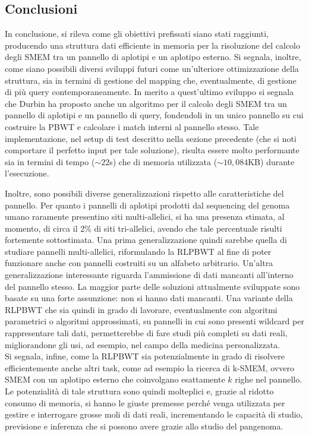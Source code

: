 \documentclass[a4paper,11pt, oneside,italian]{article}
\begin{document}
\subsection*{Conclusioni}
In conclusione, si rileva come gli obiettivi prefissati siano stati raggiunti,
producendo una struttura dati efficiente in memoria per la risoluzione del
calcolo degli SMEM tra un pannello di aplotipi e un aplotipo
esterno.  
Si segnala, inoltre, come siano possibili diversi sviluppi futuri come
un'ulteriore ottimizzazione della struttura, sia in termini 
di gestione del mapping che, eventualmente, di gestione di più query
contemporaneamente. In merito a quest'ultimo sviluppo si segnala che Durbin
ha proposto anche un algoritmo per il calcolo degli SMEM tra un pannello di
aplotipi e un pannello di query, fondendoli in un unico pannello su cui
costruire la PBWT e calcolare i match interni al pannello stesso. Tale
implementazione, nel setup di test 
descritto nella sezione precedente (che si noti comportare il perfetto input per
tale soluzione), risulta essere molto performante sia in
termini di tempo ($\sim 22$s) che di memoria utilizzata ($\sim
10,084$KB) durante l'esecuzione. 

Inoltre, sono possibili diverse generalizzazioni rispetto alle caratteristiche
del pannello. Per quanto i pannelli di aplotipi prodotti dal sequencing del
genoma umano raramente presentino siti multi-allelici, si ha una 
presenza stimata, al momento, di circa il 2\% di siti tri-allelici, avendo che
tale percentuale risulti fortemente sottostimata. Una prima generalizzazione
quindi sarebbe quella di studiare pannelli multi-allelici, riformulando la
RLPBWT al fine di poter funzionare anche con pannelli costruiti su un
alfabeto arbitrario. Un'altra generalizzazione interessante riguarda
l'ammissione di 
dati mancanti all'interno del pannello stesso. La maggior parte delle soluzioni
attualmente sviluppate sono basate su una forte assunzione: non si hanno dati
mancanti. Una variante della RLPBWT che sia quindi in grado di
lavorare, eventualmente con algoritmi parametrici o algoritmi
  approssimati, 
su pannelli in cui sono presenti wildcard per rappresentare tali dati,
permetterebbe di fare studi più completi su dati reali, migliorandone gli usi,
ad esempio, nel campo della medicina personalizzata.\\ 
Si segnala, infine, come la RLPBWT sia potenzialmente in grado di
risolvere 
efficientemente anche altri task, come ad esempio la ricerca di k-SMEM,
ovvero SMEM con un aplotipo esterno che coinvolgano
esattamente $k$ righe nel pannello. \\
Le potenzialità di tale struttura sono quindi molteplici e, grazie al ridotto
consumo di memoria, si hanno le giuste premesse perché venga utilizzata per
gestire e interrogare grosse moli di dati reali, incrementando le capacità di
studio, previsione e inferenza che si possono avere grazie allo studio del
pangenoma.
\end{document}
